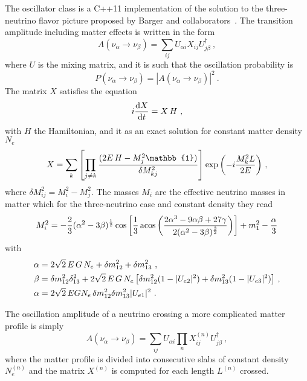 \documentclass[a4paper, 11pt]{article}
\begin{document}
The oscillator class is a C++11 implementation of the solution to the three-neutrino flavor picture proposed by Barger and collaborators~\cite{Barger:1980tf}.
The transition amplitude including matter effects is written in the form
\begin{equation}
	A(\nu_\alpha \to \nu_\beta) = \sum_{ij} U_{\alpha i} X_{ij} U_{j \beta}^\dagger\ ,
\end{equation}
where $U$ is the mixing matrix, and it is such that the oscillation probability is
\begin{equation}
	P(\nu_\alpha \to \nu_\beta) = |A(\nu_\alpha \to \nu_\beta)|^2  \ .
\end{equation}
The matrix $X$ satisfies the equation
\begin{equation}
	i \dv{X}{t} = X\,H\ ,
\end{equation}
with $H$ the Hamiltonian, and it as an exact solution for constant matter density $N_e$
\begin{equation}
	X = \sum_k \qty[\prod_{j\neq k} \frac{(2E\,H - M^2_j \mathbb{1})}{\delta M_{kj}^2}] \exp\qty(-i \frac{M_k^2 L}{2E})\ ,
\end{equation}
where $\delta M^2_{ij} = M^2_i - M^2_j$.
The masses $M_i$ are the effective neutrino masses in matter which for the three-neutrino case and constant density %
they read
\begin{equation}
	M^2_i = -\frac{2}{3}(\alpha^2 - 3\beta)^\frac{1}{2} \cos \qty[\frac{1}{3} \acos %
			\qty(\frac{2\alpha^3 - 9\alpha \beta + 27\gamma}{2(\alpha^2 - 3\beta)^{\frac{3}{2}}})] %
			+ m_1^2 - \frac{\alpha}{3}
\end{equation}
with
\begin{align}
	\alpha &= 2\sqrt{2}\,E\,G\,N_e + \delta m^2_{12} + \delta m^2_{13}\ , \\
	\beta  &= \delta m^2_{12} \delta^2_{13} + 2\sqrt{2}\,E\,G\,N_e \,\qty[\delta m^2_{12} (1-|U_{e2}|^2) + \delta m^2_{13}(1-|U_{e3}|^2)]\ , \\
	\alpha &= 2\sqrt{2}\,EGN_e \,\delta m^2_{12} \delta m^2_{13} |U_{e1}|^2\ .
\end{align}

The oscillation amplitude of a neutrino crossing a more complicated matter profile is simply
\begin{equation}
	A(\nu_\alpha \to \nu_\beta) = \sum_{ij} U_{\alpha i} \prod_n X^{(n)}_{ij} U_{j \beta}^\dagger\ ,
\end{equation}
where the matter profile is divided into consecutive slabs of constant density $N^{(n)}_e$ and the matrix $X^(n)$ is computed for %
each length $L^{(n)}$ crossed.
\end{document}
